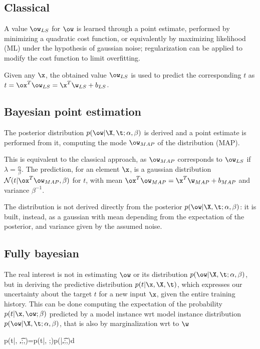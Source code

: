 \subsection*{Classical}
A value $\ow_{LS}$ for $\ow$ is learned through a point estimate, performed by minimizing a quadratic cost function, or equivalently by maximizing likelihood (ML) under the hypothesis of gaussian noise; regularization can be applied to modify the cost function to limit overfitting. 

Given any $\x$, the obtained value $\ow_{LS}$ is used to predict the corresponding $t$ as $t=\ox^T\ow_{LS}=\x^T\w_{LS}+b_{LS}$.



\subsection*{Bayesian point estimation}
The posterior distribution $p(\ow|\X,\t; \alpha,\beta)$  is derived and a point estimate is performed from it, computing the mode $\ow_{MAP}$ of the distribution (MAP). 

This is equivalent to the classical approach, as $\ow_{MAP}$ corresponds to $\ow_{LS}$ if $\lambda=\textstyle\frac{\alpha}{\beta}$. The prediction, for an element $\x$, is a gaussian distribution  $\mathcal{N}(t|\ox^T\ow_{MAP}, \beta)$ for $t$, with mean $\ox^{T}\ow_{MAP}=\x^T\w_{MAP}+b_{MAP}$ and variance $\beta^{-1}$.

The distribution is not derived directly from the posterior  $p(\ow|\X,\t;\alpha,\beta)$: it is built, instead, as a gaussian with mean depending from the expectation of the posterior, and variance given by the assumed noise.

\subsection*{Fully bayesian}
The real interest is not in estimating $\ow$ or its distribution $p(\ow|\X,\t;\alpha,\beta)$, but in deriving the \alert{predictive distribution} $p(t|\x, \X, \t)$, which expresses our uncertainty about the target $t$ for a new input $\x$, given the entire training history. This can be done computing the expectation of the probability $p(t|\x, \ow;\beta)$ predicted by a model instance wrt  model instance distribution $p(\ow|\X,\t;\alpha,\beta)$, that is also by marginalization wrt to  $\w$
\begin{myequation}
p(t|\x, \t,\X;\alpha,\beta)=\int p(t|\x, \ow;\beta)p(\ow|\t,\X;\alpha,\beta)d\ow
\end{myequation}

